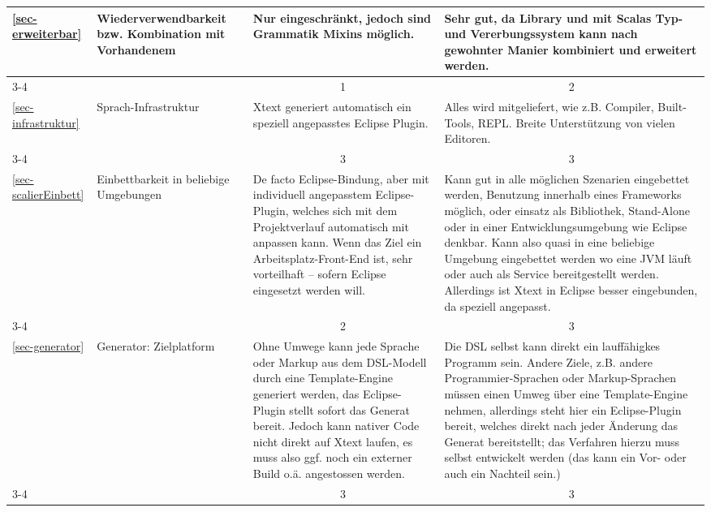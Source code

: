 \begin{landscape}
\begin{longtable}{|p{0.8cm}|p{4.4cm}|p{6.4cm}|p{6.4cm}|}
  \ref{sec-erweiterbar}
  & Wiederverwendbarkeit bzw. Kombination mit Vorhandenem
  & Nur eingeschränkt, jedoch sind Grammatik Mixins möglich.
  & Sehr gut, da Library und mit Scalas Typ- und Vererbungssystem kann nach
    gewohnter Manier kombiniert und erweitert werden.
  \\
  \cline{3-4}
  & & \multicolumn{1}{c|}{ 1 } & \multicolumn{1}{c|}{ 2 } \\ \hline

  \ref{sec-infrastruktur}
  & Sprach-Infrastruktur
  & Xtext generiert automatisch ein speziell angepasstes Eclipse Plugin.
  & Alles wird mitgeliefert, wie z.B. Compiler, Built-Tools, REPL.
    Breite Unterstützung von vielen Editoren.
  \\
  \cline{3-4}
  & & \multicolumn{1}{c|}{ 3 } & \multicolumn{1}{c|}{ 3 } \\ \hline

  \ref{sec-scalierEinbett}
  & Einbettbarkeit in beliebige Umgebungen
  & De facto Eclipse-Bindung, aber mit individuell angepasstem Eclipse-Plugin,
    welches sich mit dem Projektverlauf automatisch mit anpassen kann.
    Wenn das Ziel ein Arbeitsplatz-Front-End ist, sehr vorteilhaft -- sofern
    Eclipse eingesetzt werden will.
  & Kann gut in alle möglichen Szenarien eingebettet werden, Benutzung
    innerhalb eines Frameworks möglich, oder einsatz als Bibliothek,
    Stand-Alone oder in einer Entwicklungsumgebung wie Eclipse denkbar.
    Kann also quasi in eine beliebige Umgebung eingebettet werden
    wo eine JVM läuft oder auch als Service bereitgestellt werden.
    Allerdings ist Xtext in Eclipse besser eingebunden, da speziell angepasst.
  \\
  \cline{3-4}
  & & \multicolumn{1}{c|}{ 2 } & \multicolumn{1}{c|}{ 3 } \\ \hline

  \ref{sec-generator}
  & Generator: Zielplatform
  & Ohne Umwege kann jede Sprache oder Markup aus dem DSL-Modell durch eine
    Template-Engine generiert werden, das Eclipse-Plugin stellt sofort das
    Generat bereit. Jedoch kann nativer Code nicht direkt auf Xtext laufen,
    es muss also ggf. noch ein externer Build o.ä. angestossen werden.
  & Die DSL selbst kann direkt ein lauffähigkes Programm sein. Andere Ziele,
    z.B. andere Programmier-Sprachen oder Markup-Sprachen müssen einen Umweg
    über eine Template-Engine nehmen, allerdings steht hier ein Eclipse-Plugin
    bereit, welches direkt nach jeder Änderung das Generat bereitstellt; das
    Verfahren hierzu muss selbst entwickelt werden (das kann ein Vor- oder
    auch ein Nachteil sein.)
  \\
  \cline{3-4}
  & & \multicolumn{1}{c|}{ 3 } & \multicolumn{1}{c|}{ 3 } \\ \hline


\end{longtable}
\end{landscape}
